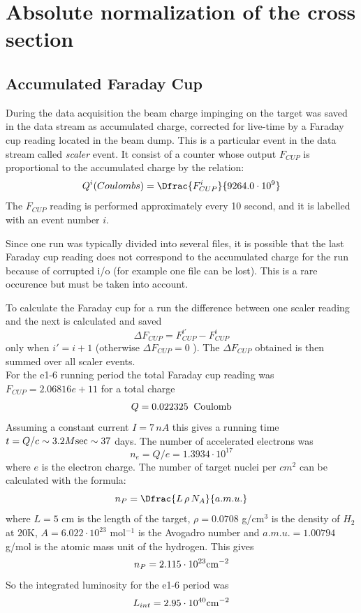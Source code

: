 \cia\vspace{-2cm}
\section{Absolute normalization of the cross section}
\subsection{Accumulated Faraday Cup}
During the data acquisition the beam charge impinging on the target was saved in the data 
stream as accumulated charge, corrected for live-time by a Faraday cup reading located in the beam dump.
This is a particular event in the data stream called {\it scaler} event.
It consist of a counter whose output $F_{CUP}$ is proportional to the accumulated charge by the relation:
$$
Q^i (Coulombs) = \Dfrac{F^i_{CUP}}{9264.0 \cdot 10^9}
$$
The $F_{CUP}$ reading is performed approximately every 10 second, and it is labelled with an event number
$i$.

Since one run was typically divided into several files, it is possible that the last
Faraday cup reading does not correspond to the accumulated charge for the run because
of corrupted i/o (for example one file can be lost). This is a rare occurence
but must be taken into account. 

To calculate the Faraday cup for a run the difference between
one scaler reading and the next is calculated and saved
$$
\Delta F_{CUP} = F_{CUP}^{i'} - F_{CUP}^i
$$ 
only when $i' = i+1$ (otherwise $\Delta F_{CUP}=0$ ). The $\Delta F_{CUP}$ obtained is then summed 
over all scaler events. \\

For the e1-6 running period the total Faraday cup reading was $F_{CUP} = 2.06816e+11$ for a total charge
$$
Q = 0.022325\;\;{\rm Coulomb}
$$
Assuming a constant current $I=7\,nA$ this gives a running time $t=Q/c\sim 3.2 M {\rm sec} \sim 37$ days.
The number of accelerated electrons was
$$
n_e = Q/e = 1.3934 \cdot 10^{17}
$$
where $e$ is the electron charge.
The number of target nuclei per $cm^2$ can be calculated with the formula:
$$
n_P = \Dfrac{L\,\rho\,N_A}{a.m.u.}
$$
where $L=5$ cm is the length of the target, $\rho=0.0708$ g/cm$^3$ is the density of $H_2$ at $20$K,
$A= 6.022\cdot10^{23}$ mol$^{-1}$ is the Avogadro number and $a.m.u. = 1.00794$ g/mol is the atomic mass unit 
of the hydrogen.
This gives
$$
n_P = 2.115\cdot 10^{23} {\rm cm^{-2}}
$$
So the integrated luminosity for the e1-6 period was
$$
L_{int} = 2.95\cdot 10^{40} {\rm cm^{-2}}
$$

